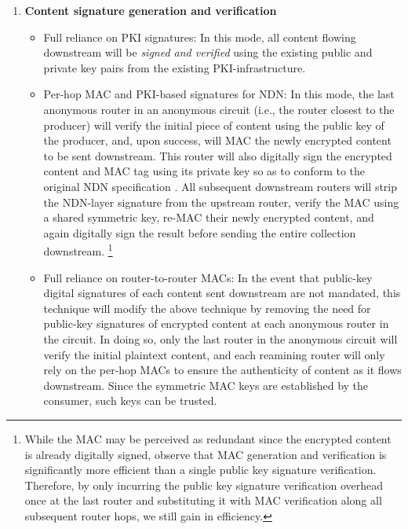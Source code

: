 \documentclass[10pt]{article}
\begin{document}
\begin{enumerate}
\item \textbf{Content signature generation and verification}
\begin{itemize}
  \item Full reliance on PKI signatures: In this mode, all content flowing downstream will be \emph{signed and verified} using the existing public and private key pairs from the existing PKI-infrastructure. 

  \item Per-hop MAC and PKI-based signatures for NDN: In this mode, the last anonymous router in an anonymous circuit (i.e., the router closest to the producer) will verify the initial piece of content using the public key of the producer, and, upon success, will MAC the newly encrypted content to be sent downstream. This router will also digitally sign the encrypted content and MAC tag using its private key so as to conform to the original NDN specification \cite{ndn-tech-report}. All subsequent downstream routers will strip the NDN-layer signature from the upstream router, verify the MAC using a shared symmetric key, re-MAC their newly encrypted content, and again digitally sign the result before sending the entire collection downstream. \footnote{While the MAC may be perceived as redundant since the encrypted content is already digitally signed, observe that MAC generation and verification is significantly more efficient than a single public key signature verification. Therefore, by only incurring the public key signature verification overhead once at the last router and substituting it with MAC verification along all subsequent router hops, we still gain in efficiency.}

  \item Full reliance on router-to-router MACs: In the event that public-key digital signatures of each content sent downstream are not mandated, this technique will modify the above technique by removing the need for public-key signatures of encrypted content at each anonymous router in the circuit. In doing so, only the last router in the anonymous circuit will verify the initial plaintext content, and each reamining router will only rely on the per-hop MACs to ensure the authenticity of content as it flows downstream. Since the symmetric MAC keys are established by the consumer, such keys can be trusted. 
\end{itemize}



\end{enumerate}
\end{document}
